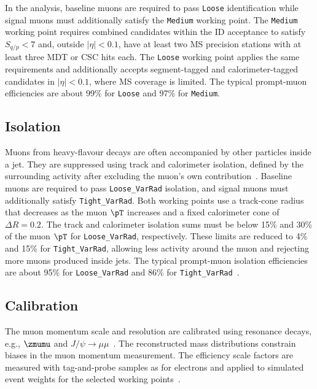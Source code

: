 In the analysis, baseline muons are required to pass \texttt{Loose} identification while signal muons must additionally satisfy the \texttt{Medium} working point.
The \texttt{Medium} working point requires combined candidates within the ID acceptance to satisfy $S_{q/p}<7$ and, outside $|\eta|<0.1$, have at least two MS precision stations with at least three MDT or CSC hits each.
The \texttt{Loose} working point applies the same requirements and additionally accepts segment-tagged and calorimeter-tagged candidates in $|\eta|<0.1$, where MS coverage is limited.
The typical prompt-muon efficiencies are about 99\% for \texttt{Loose} and 97\% for \texttt{Medium}.

\subsection{Isolation}

Muons from heavy-flavour decays are often accompanied by other particles inside a jet.
They are suppressed using track and calorimeter isolation, defined by the surrounding activity after excluding the muon's own contribution~\cite{ATLAS2021MuonID}.
Baseline muons are required to pass \texttt{Loose\_VarRad} isolation, and signal muons must additionally satisfy \texttt{Tight\_VarRad}.
Both working points use a track-cone radius that decreases as the muon $\pT$ increases and a fixed calorimeter cone of $\Delta R=0.2$.
The track and calorimeter isolation sums must be below 15\% and 30\% of the muon $\pT$ for \texttt{Loose\_VarRad}, respectively.
These limits are reduced to 4\% and 15\% for \texttt{Tight\_VarRad}, allowing less activity around the muon and rejecting more muons produced inside jets.
The typical prompt-muon isolation efficiencies are about 95\% for \texttt{Loose\_VarRad} and 86\% for \texttt{Tight\_VarRad}~\cite{ATLAS2024MuonIsolation}.

\subsection{Calibration}

The muon momentum scale and resolution are calibrated using resonance decays, e.g., $\zmumu$ and $J/\psi\rightarrow\mu\mu$~\cite{ATLAS2023MuonCalibration}.
The reconstructed mass distributions constrain biases in the muon momentum measurement.
The efficiency scale factors are measured with tag-and-probe samples as for electrons and applied to simulated event weights for the selected working points~\cite{ATLAS2021MuonID}.
